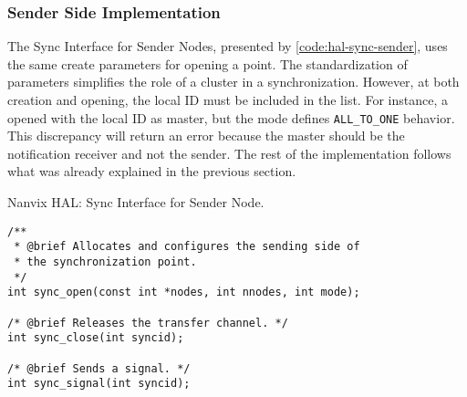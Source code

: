 
			\subsubsection{Sender Side Implementation}


				The Sync Interface for Sender Nodes, presented by \autoref{code:hal-sync-sender}, uses the same create parameters for opening a \sync point. The standardization of parameters simplifies the role of a cluster in a synchronization. However, at both creation and opening, the local ID must be included in the list. For instance, a \sync opened with the local ID as master, but the mode defines \texttt{ALL\_TO\_ONE} behavior. This discrepancy will return an error because the master should be the notification receiver and not the sender. The rest of the implementation follows what was already explained in the previous section.

\begin{listing}[!tb]
\caption{Nanvix HAL: Sync Interface for Sender Node.}
\label{code:hal-sync-sender}
\begin{verbatim}
/**
 * @brief Allocates and configures the sending side of
 * the synchronization point.
 */
int sync_open(const int *nodes, int nnodes, int mode);

/* @brief Releases the transfer channel. */
int sync_close(int syncid);

/* @brief Sends a signal. */
int sync_signal(int syncid);
\end{verbatim}
\end{listing}

